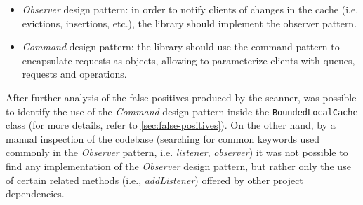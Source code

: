 \begin{itemize}
	\item \textit{Observer} design pattern: in order to notify clients of changes in the cache (i.e. evictions, insertions, etc.), the library should implement the observer pattern.
	\item \textit{Command} design pattern: the library should use the command pattern to encapsulate requests as objects, allowing to parameterize clients with queues, requests and operations.
\end{itemize}

\noindent After further analysis of the false-positives produced by the scanner, was possible to identify the use of the \textit{Command} design pattern inside the \texttt{BoundedLocalCache} class (for more details, refer to \autoref{sec:false-positives}). On the other hand, by a manual inspection of the codebase (searching for common keywords used commonly in the \textit{Observer} pattern, i.e. \textit{listener}, \textit{observer}) it was not possible to find any implementation of the \textit{Observer} design pattern, but rather only the use of certain related methods (i.e., \textit{addListener}) offered by other project dependencies.

